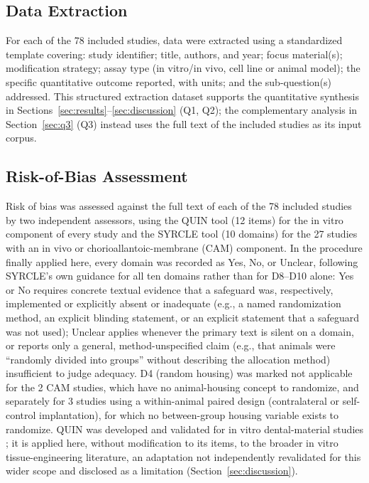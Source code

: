 \documentclass[5p,times,twocolumn]{elsarticle}
\begin{document}
\subsection{Data Extraction}

For each of the 78 included studies, data were extracted using a standardized template covering: study identifier; title, authors, and year; focus material(s); modification strategy; assay type (in vitro/in vivo, cell line or animal model); the specific quantitative outcome reported, with units; and the sub-question(s) addressed. This structured extraction dataset supports the quantitative synthesis in Sections~\ref{sec:results}--\ref{sec:discussion} (Q1, Q2); the complementary analysis in Section~\ref{sec:q3} (Q3) instead uses the full text of the included studies as its input corpus.

\subsection{Risk-of-Bias Assessment}
\label{sec:rob}

Risk of bias was assessed against the full text of each of the 78 included studies by two independent assessors, using the QUIN tool \cite{ref84} (12 items) for the in vitro component of every study and the SYRCLE tool \cite{ref85} (10 domains) for the 27 studies with an in vivo or chorioallantoic-membrane (CAM) component. In the procedure finally applied here, every domain was recorded as Yes, No, or Unclear, following SYRCLE's own guidance for all ten domains rather than for D8--D10 alone: Yes or No requires concrete textual evidence that a safeguard was, respectively, implemented or explicitly absent or inadequate (e.g., a named randomization method, an explicit blinding statement, or an explicit statement that a safeguard was not used); Unclear applies whenever the primary text is silent on a domain, or reports only a general, method-unspecified claim (e.g., that animals were ``randomly divided into groups'' without describing the allocation method) insufficient to judge adequacy. D4 (random housing) was marked not applicable for the 2 CAM studies, which have no animal-housing concept to randomize, and separately for 3 studies using a within-animal paired design (contralateral or self-control implantation), for which no between-group housing variable exists to randomize. QUIN was developed and validated for in vitro dental-material studies \cite{ref84}; it is applied here, without modification to its items, to the broader in vitro tissue-engineering literature, an adaptation not independently revalidated for this wider scope and disclosed as a limitation (Section~\ref{sec:discussion}).
\end{document}
